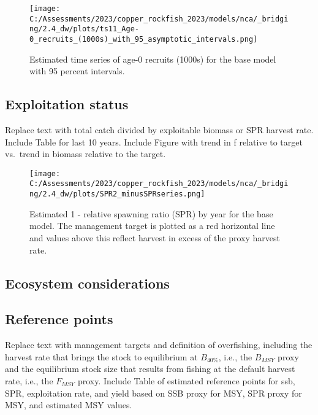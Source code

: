 \documentclass[11pt,
  english,
  letterpaper,
]{article}
\begin{document}


\begin{figure}
\centering
\texttt{[image: C:/Assessments/2023/copper\_rockfish\_2023/models/nca/\_bridging/2.4\_dw/plots/ts11\_Age-0\_recruits\_(1000s)\_with\_95\_asymptotic\_intervals.png]}
\caption{Estimated time series of age-0 recruits (1000s) for the base model with 95 percent intervals.\label{fig:es-recruits}}
\end{figure}

\clearpage

\hypertarget{exploitation-status}{%
\subsection*{Exploitation status}\label{exploitation-status}}

Replace text with total catch divided by exploitable biomass or SPR harvest rate. Include Table for last 10 years. Include Figure with trend in f relative to target vs.~trend in biomass relative to the target.



\begin{figure}
\centering
\texttt{[image: C:/Assessments/2023/copper\_rockfish\_2023/models/nca/\_bridging/2.4\_dw/plots/SPR2\_minusSPRseries.png]}
\caption{Estimated 1 - relative spawning ratio (SPR) by year for the base model. The management target is plotted as a red horizontal line and values above this reflect harvest in excess of the proxy harvest rate.\label{fig:es-1-spr}}
\end{figure}

\hypertarget{ecosystem-considerations}{%
\subsection*{Ecosystem considerations}\label{ecosystem-considerations}}

\hypertarget{reference-points}{%
\subsection*{Reference points}\label{reference-points}}

Replace text with management targets and definition of overfishing, including the harvest rate that brings the stock to equilibrium at \(B_{40\%}\), i.e., the \(B_{MSY}\) proxy and the equilibrium stock size that results from fishing at the default harvest rate, i.e., the \(F_{MSY}\) proxy. Include Table of estimated reference points for ssb, SPR, exploitation rate, and yield based on SSB proxy for MSY, SPR proxy for MSY, and estimated MSY values.
\end{document}
